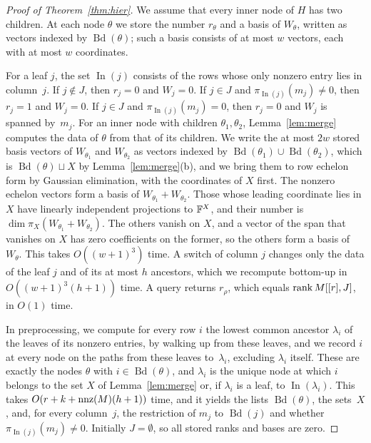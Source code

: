 \begin{proof}[Proof of Theorem~\ref{thm:hier}]
We assume that every inner node of $H$ has two children.
At each node $\theta$ we store the number $r_\theta$ and a basis of $W_\theta$, written as vectors indexed by $\operatorname{Bd}(\theta)$; such a basis consists of at most $w$ vectors, each with at most $w$ coordinates.

For a leaf $j$, the set $\operatorname{In}(j)$ consists of the rows whose only nonzero entry lies in column~$j$.
If $j\notin J$, then $r_j=0$ and $W_j=0$.
If $j\in J$ and $\pi_{\operatorname{In}(j)}(m_j)\ne0$, then $r_j=1$ and $W_j=0$.
If $j\in J$ and $\pi_{\operatorname{In}(j)}(m_j)=0$, then $r_j=0$ and $W_j$ is spanned by~$m_j$.
For an inner node with children $\theta_1,\theta_2$, Lemma~\ref{lem:merge} computes the data of $\theta$ from that of its children.
We write the at most $2w$ stored basis vectors of $W_{\theta_1}$ and $W_{\theta_2}$ as vectors indexed by $\operatorname{Bd}(\theta_1)\cup\operatorname{Bd}(\theta_2)$, which is $\operatorname{Bd}(\theta)\sqcup X$ by Lemma~\ref{lem:merge}(b), and we bring them to row echelon form by Gaussian elimination, with the coordinates of $X$ first.
The nonzero echelon vectors form a basis of $W_{\theta_1}+W_{\theta_2}$.
Those whose leading coordinate lies in $X$ have linearly independent projections to $\mathbb{F}^X$, and their number is $\dim\pi_X(W_{\theta_1}+W_{\theta_2})$.
The others vanish on $X$, and a vector of the span that vanishes on $X$ has zero coefficients on the former, so the others form a basis of~$W_\theta$.
This takes $O((w+1)^3)$ time.
A switch of column $j$ changes only the data of the leaf $j$ and of its at most $h$ ancestors, which we recompute bottom-up in $O((w+1)^3(h+1))$ time.
A query returns $r_\rho$, which equals $\operatorname{rank} M[[r],J]$, in $O(1)$ time.

In preprocessing, we compute for every row $i$ the lowest common ancestor $\lambda_i$ of the leaves of its nonzero entries, by walking up from these leaves, and we record $i$ at every node on the paths from these leaves to~$\lambda_i$, excluding $\lambda_i$ itself.
These are exactly the nodes $\theta$ with $i\in\operatorname{Bd}(\theta)$, and $\lambda_i$ is the unique node at which $i$ belongs to the set $X$ of Lemma~\ref{lem:merge} or, if $\lambda_i$ is a leaf, to $\operatorname{In}(\lambda_i)$.
This takes $O(r+k+\operatorname{nnz}(M)(h+1))$ time, and it yields the lists $\operatorname{Bd}(\theta)$, the sets~$X$, and, for every column~$j$, the restriction of $m_j$ to $\operatorname{Bd}(j)$ and whether $\pi_{\operatorname{In}(j)}(m_j)\ne0$.
Initially $J=\emptyset$, so all stored ranks and bases are zero.
\end{proof}

